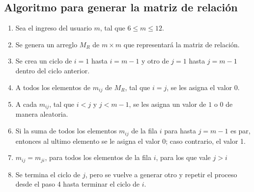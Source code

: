 \documentclass[12pt]{article}
\begin{document}
\subsection{Algoritmo para generar la matriz de relaci\'{o}n}
\begin{enumerate}
\item Sea el ingreso del usuario $m$, tal que $6\leq m\leq 12$.
\item Se genera un arreglo $M_{R}$ de $m \times m$ que representar\'{a} la matriz de relaci\'{o}n.
\item Se crea un ciclo de $i=1$ hasta $i=m-1$ y otro de $j=1$ hasta $j=m-1$ dentro del ciclo anterior.
\item A todos los elementos de $m_{ij}$ de $M_{R}$, tal que $i=j$, se les asigna el valor $0$.
\item A cada $m_{ij}$, tal que $i<j$ y $j<m-1$, se les asigna un valor de $1$ o $0$ de manera aleatoria.
\item Si la suma de todos los elementos $m_{ij}$ de la fila $i$ para hasta $j=m-1$ es par, entonces al ultimo elemento se le asigna el valor 0; caso contrario, el valor 1.
\item $m_{ij}=m_{ji}$, para todos los elementos de la fila $i$, para los que vale $j>i$
\item Se termina el ciclo de $j$, pero se vuelve a generar otro y repetir el proceso desde el paso 4 hasta terminar el ciclo de $i$.
\end{enumerate}
\end{document}
